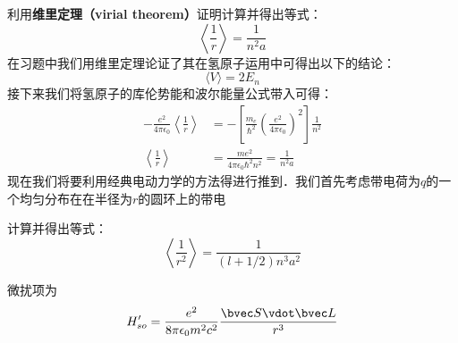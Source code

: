 \begin{exercise}{}\label{HfineS_exe1}
利用\textbf{维里定理（virial theorem）}证明计算并得出等式：
\begin{equation}
\left\langle\frac{1}{r}\right\rangle = \frac{1}{n^2a}
\end{equation}
在习题中我们用维里定理论证了其在氢原子运用中可得出以下的结论：
\begin{equation}
\langle V\rangle =2E_n
\end{equation}
接下来我们将氢原子的库伦势能和波尔能量公式带入可得：
\begin{align}
-\frac{e^2}{4\pi\epsilon_0}\left\langle \frac{1}{r}\right\rangle&=-\left[\frac {m_e}{\hbar^{2}} \left(\frac {e^ {2}}{4\pi \epsilon_0}\right)^ {2}\right]  \frac {1}{n^ {2}}\\
\left\langle \frac{1}{r}\right\rangle&=\frac{me^2}{4\pi\epsilon_0\hbar^2n^2}=\frac{1}{n^2a}
\end{align}
现在我们将要利用经典电动力学的方法得进行推到．我们首先考虑带电荷为$q$的一个均匀分布在在半径为$r$的圆环上的带电


\end{exercise}
\begin{exercise}{}\label{HfineS_exe2}
计算并得出等式：
\begin{equation}
\left\langle \frac{1}{r^2}\right\rangle = \frac{1}{(l+1/2)n^3a^2}
\end{equation}
\end{exercise}
微扰项为
\begin{equation}
H'_{so} = \frac{e^2}{8\pi \epsilon_0 m^2 c^2} \frac{\bvec S \vdot \bvec L}{r^3}
\end{equation}
